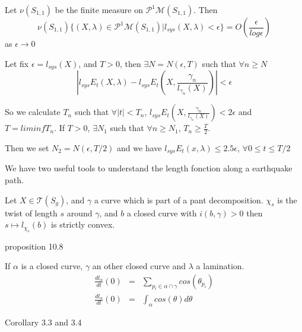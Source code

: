 
\begin{thm} Let $\nu(S_{1,1})$ be the finite measure on $\mathcal{P}^1 \mathcal{M}(S_{1,1})$. Then \[
\nu(S_{1,1})\{ (X,\lambda) \in \mathcal{P}^1 \mathcal{M}(S_{1,1}) | l_{sys}(X,\lambda) < \epsilon \} = O(\frac{\epsilon}{log \epsilon})
\] as $\epsilon \rightarrow 0 $
\end{thm}

\hrulefill

Let fix $\epsilon=l_{sys}(X)$, and $T > 0 $, then $\exists N=N(\epsilon,T)$ such that $\forall n \geq N$ \[
| l_{sys}E_t(X,\lambda)-l_{sys}E_t(X,\frac{\gamma_n}{l_{\gamma_n}(X)})| < \epsilon
\]

So we calculate $T_n$ such that $\forall |t| < T_n$,
 $l_{sys}E_t(X,\frac{\gamma_n}{l_{\gamma_n}(X)}) < 2 \epsilon$
and $T=liminf T_n$. If $T>0$, $\exists N_1$ such that $\forall n \geq N_1$, $T_n \geq \frac{T}{2}$.

Then we set $N_2=N(\epsilon,T/2)$ and we have $l_{sys}E_t(x,\lambda) \leq 2.5 \epsilon $, $\forall 0 \leq t \leq T/2$


\hrulefill

We have two useful tools to understand the length fonction along a earthquake path.

\begin{lem}
Let $X \in \mathcal{T}(S_g)$, and $\gamma$ a curve which is part of a pant decomposition.
 $\chi_s$
  is the twist of length $s$ around $\gamma$, and $b$ a closed curve with $i(b,\gamma) > 0$ then $s \mapsto l_{\chi_s}(b)$ is strictly convex.
\end{lem}
\cite{farb2011primer} proposition 10.8

\begin{lem}
If $\alpha$ is a closed curve, $\gamma$ an other closed curve and $\lambda$ a lamination.\[
\begin{array}{crcl}

\frac{dl_{\alpha}}{dt}(0) & = & \sum_{p_i \in \alpha \cap \gamma} cos(\theta_{p_i}) \\

\frac{dl_{\alpha}}{dt}(0) & = & \int_{ \alpha} cos(\theta) d \theta

\end{array}
\]
\end{lem}
\cite{NielsenRealizationPro} Corollary 3.3 and 3.4
